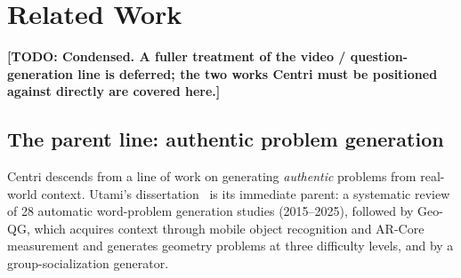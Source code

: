 \documentclass[conference]{IEEEtran}
\newcommand{\todo}[1]{{\color{red}\textbf{[TODO: #1]}}}
\begin{document}
%
%
%
\section{Related Work}
\label{sec:related}
\todo{Condensed. A fuller treatment of the video / question-generation line is
deferred; the two works Centri must be positioned against directly are
covered here.}

\subsection{The parent line: authentic problem generation}

Centri descends from a line of work on generating \emph{authentic} problems
from real-world context. Utami's dissertation~\cite{utami} is its immediate
parent: a systematic review of 28 automatic word-problem generation studies
(2015--2025), followed by Geo-QG, which acquires context through mobile object
recognition and AR-Core measurement and generates geometry problems at three
difficulty levels, and by a group-socialization generator.
\end{document}
